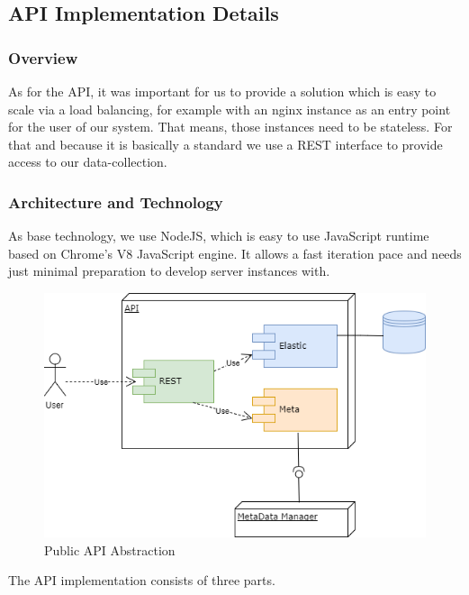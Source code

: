 \subsection{API Implementation
Details}\label{api-implementation-details}

\subsubsection{Overview}\label{overview-1}

As for the API, it was important for us to provide a solution which is
easy to scale via a load balancing, for example with an nginx instance
as an entry point for the user of our system. That means, those
instances need to be stateless. For that and because it is basically a
standard we use a REST interface to provide access to our
data-collection.

\subsubsection{Architecture and
Technology}\label{architecture-and-technology}

As base technology, we use NodeJS, which is easy to use JavaScript
runtime based on Chrome's V8 JavaScript engine. It allows a fast
iteration pace and needs just minimal preparation to develop server
instances with.

\begin{figure}[htbp]
\centering
\includegraphics[width=1.00\textwidth]{images/07_API_Architecture.png}
\caption{Public API Abstraction}
\label{fig:public-api}
\end{figure}

The API implementation consists of three parts.

